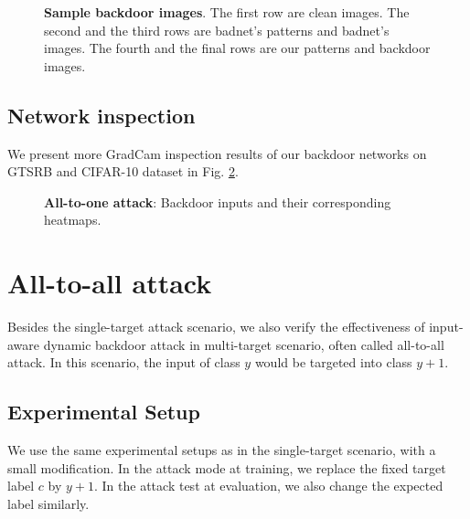 \documentclass{article}
\begin{document}
\begin{figure}[t]
    \vspace{-1mm}
\caption{{\bfseries Sample backdoor images}. The first row are clean images. The second and the third rows are badnet's patterns and badnet's images. The fourth and the final rows are our patterns and backdoor images.}
    \vspace{-4mm}
\label{fig:all2one_sample}
\end{figure}

\subsection{Network inspection}
We present more GradCam inspection results of our backdoor networks on GTSRB and CIFAR-10 dataset in Fig. \ref{fig:gradcam_all2one}.

\begin{figure}[t]
\centering
{}
\hspace{2mm}
    \vspace{-1mm}
\caption{{\bfseries All-to-one attack}: Backdoor inputs and their corresponding heatmaps.}
\label{fig:gradcam_all2one}
\end{figure}

\section{All-to-all attack}
Besides the single-target attack scenario, we also verify the effectiveness of input-aware dynamic backdoor attack in multi-target scenario, often called all-to-all attack. In this scenario, the input of class $y$ would be targeted into class $y + 1$.
\subsection{Experimental Setup}
We use the same experimental setups as in the single-target scenario, with a small modification. In the attack mode at training, we replace the fixed target label $c$ by $y+1$. In the attack test at evaluation, we also change the expected label similarly.
\end{document}
